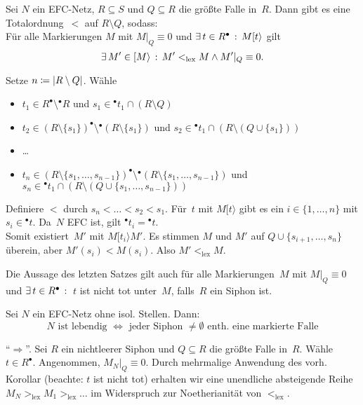 \documentclass{cheat-sheet}
\newcommand{\preset}[1]{{}^\bullet{#1}} %
\newcommand{\postset}[1]{{#1}^\bullet} %
\newcommand{\activeTransition}[1]{[{#1}\rangle} %
\begin{document}
\begin{lem}
  Sei $N$ ein EFC-Netz, $R \subseteq S$ und $Q \subseteq R$ die größte Falle in~$R$.
  Dann gibt es eine Totalordnung~${<}$ auf $R \setminus Q$, sodass: \\[0.2em]
  Für alle Markierungen $M$ mit $M|_Q \equiv 0$ und $\ex{t \in \postset{R}} M \activeTransition{t}$ gilt
  \[
    \ex{M' \in \activeTransition{M}} M' <_\mathrm{lex} M \wedge M'|_Q \equiv 0.
  \]
\end{lem}

\begin{beweis}
  Setze $n \coloneqq \lvert R \setminus Q\rvert$.
  Wähle
  \begin{itemize}
    \item $t_1 \in \postset{R} \setminus \preset{R}$ und $s_1 \in \preset{t_1} \cap (R \setminus Q)$
    \item $t_2 \in \postset{(R \setminus \{ s_1 \})} \setminus \preset{(R \setminus \{ s_1 \})}$ und $s_2 \in \preset{t_1} \cap (R \setminus (Q \cup \{ s_1 \}))$
    \item \ldots
    \item $t_n \in \postset{(R \setminus \{ s_1, \ldots, s_{n-1} \})} \setminus \preset{(R \setminus \{ s_1, \ldots, s_{n-1} \})}$ und $s_n \in \preset{t_1} \cap (R \setminus (Q \cup \{ s_1, \ldots, s_{n-1} \}))$
  \end{itemize}
  Definiere ${<}$ durch $s_n < \ldots < s_2 < s_1$.
  Für~$t$ mit $M \activeTransition{t}$ gibt es ein $i \in \{ 1, \ldots, n \}$ mit $s_i \in \preset{t}$.
  Da~$N$ EFC ist, gilt $\preset{t_i} = \preset{t}$. \\
  Somit existiert~$M'$ mit $M \activeTransition{t_i} M'$.
  Es stimmen $M$ und $M'$ auf $Q \cup \{ s_{i+1}, \ldots, s_n \}$ überein, aber $M'(s_i) < M(s_i)$.
  Also $M' <_\mathrm{lex} M$.
\end{beweis}

\begin{kor}
  Die Aussage des letzten Satzes gilt auch für alle Markierungen~$M$ mit $M|_Q \equiv 0$ und $\ex{t \in \postset{R}}$ $t$ ist nicht tot unter~$M$, falls~$R$ ein Siphon ist.
\end{kor}

\begin{satz}
  Sei $N$ ein EFC-Netz ohne isol. Stellen.
  Dann:
  \[
    \text{$N$ ist lebendig $\iff$ jeder Siphon $\neq \emptyset$ enth. eine markierte Falle}
  \]
\end{satz}

\begin{beweis}
  "`$\Rightarrow$"'.
  Sei $R$ ein nichtleerer Siphon und $Q \subseteq R$ die größte Falle in~$R$.
  Wähle $t \in \postset{R}$.
  Angenommen, $M_N|_Q \equiv 0$.
  Durch mehrmalige Anwendung des vorh. Korollar (beachte: $t$ ist nicht tot) erhalten wir eine unendliche absteigende Reihe $M_N >_\mathrm{lex} M_1 >_\mathrm{lex} \ldots$ im Widerspruch zur Noetherianität von ${<_\mathrm{lex}}$.
\end{beweis}
\end{document}
